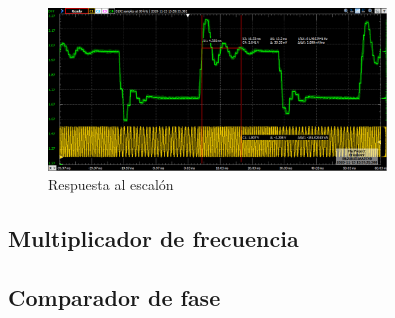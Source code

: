 \begin{figure}[h!]
	\includegraphics[width= 0.8\textwidth]{../1. PLL/Imagenes/RespEscalonMedicion.png}
	\centering
	\caption{Respuesta al escalón}
	\label{fig:REspEscalon}
\end{figure}

\subsection{Multiplicador de frecuencia}



\subsection{Comparador de fase}